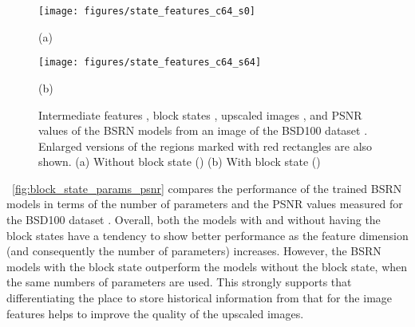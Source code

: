 \documentclass[runningheads]{llncs}
\begin{document}
\begin{figure*}[t!]
	\begin{center}
		\centering
		\begin{minipage}[b]{0.995\linewidth}
			\centering
			\centerline{\texttt{[image: figures/state\_features\_c64\_s0]}}
			\centerline{(a)}
		\end{minipage}
		\begin{minipage}[b]{0.995\linewidth}
			\centering
			\centerline{\texttt{[image: figures/state\_features\_c64\_s64]}}
			\centerline{(b)}
		\end{minipage}
	\end{center}
	\caption{Intermediate features , block states , upscaled images , and PSNR values of the BSRN models from an image of the BSD100 dataset \cite{martin2001database}. Enlarged versions of the regions marked with red rectangles are also shown. (a) Without block state () (b) With block state ()}
	\label{fig:state_features}
\end{figure*}

\figurename~\ref{fig:block_state_params_psnr} compares the performance of the trained BSRN models in terms of the number of parameters and the PSNR values measured for the BSD100 dataset \cite{martin2001database}.
Overall, both the models with and without having the block states have a tendency to show better performance as the feature dimension (and consequently the number of parameters) increases.
However, the BSRN models with the block state outperform the models without the block state, when the same numbers of parameters are used.
This strongly supports that differentiating the place to store historical information from that for the image features helps to improve the quality of the upscaled images.
\end{document}
